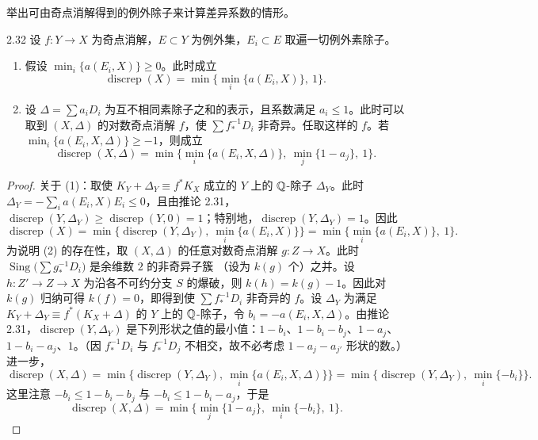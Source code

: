 
举出可由奇点消解得到的例外除子来计算差异系数的情形。

\begin{corollaryp}{2.32}
设 $f\colon Y\to X$ 为奇点消解，$E\subset Y$ 为例外集，$E_i\subset E$ 取遍一切例外素除子。
\begin{enumerate}[label=（\arabic*）,leftmargin=2.6em,itemsep=1pt]
\item 假设 $\min_i\{a(E_i,X)\}\ge0$。此时成立
\[
\operatorname{discrep}(X)=\min\bigl\{\min_i\{a(E_i,X)\},\ 1\bigr\}.
\]
\item 设 $\Delta=\sum a_iD_i$ 为互不相同素除子之和的表示，且系数满足 $a_i\le1$。此时可以取到 $(X,\Delta)$ 的对数奇点消解 $f$，使 $\sum f_*^{-1}D_i$ 非奇异。任取这样的 $f$。若 $\min_i\{a(E_i,X,\Delta)\}\ge-1$，则成立
\[
\operatorname{discrep}(X,\Delta)=\min\bigl\{\min_i\{a(E_i,X,\Delta)\},\ \min_j\{1-a_j\},\ 1\bigr\}.
\]
\end{enumerate}
\end{corollaryp}
\begin{proof}
关于 (1)：取使 $K_Y+\Delta_Y\equiv f^*K_X$ 成立的 $Y$ 上的 $\mathbb{Q}$-除子 $\Delta_Y$。此时 $\Delta_Y=-\sum_i a(E_i,X)E_i\le0$，且由推论 2.31，$\operatorname{discrep}(Y,\Delta_Y)\ge\operatorname{discrep}(Y,0)=1$；特别地，$\operatorname{discrep}(Y,\Delta_Y)=1$。因此
\[
\operatorname{discrep}(X)=\min\bigl\{\operatorname{discrep}(Y,\Delta_Y),\ \min_i\{a(E_i,X)\}\bigr\}=\min\bigl\{\min_i\{a(E_i,X)\},\ 1\bigr\}.
\]
为说明 (2) 的存在性，取 $(X,\Delta)$ 的任意对数奇点消解 $g\colon Z\to X$。此时 $\operatorname{Sing}\bigl(\sum g_*^{-1}D_i\bigr)$ 是余维数 $2$ 的非奇异子簇
（设为 $k(g)$ 个）之并。设 $h\colon Z'\to Z\to X$ 为沿各不可约分支 $S$ 的爆破，则 $k(h)=k(g)-1$。因此对 $k(g)$ 归纳可得 $k(f)=0$，即得到使 $\sum f_*^{-1}D_i$ 非奇异的 $f$。设 $\Delta_Y$ 为满足 $K_Y+\Delta_Y\equiv f^*(K_X+\Delta)$ 的 $Y$ 上的 $\mathbb{Q}$-除子，令 $b_i=-a(E_i,X,\Delta)$。由推论 2.31，$\operatorname{discrep}(Y,\Delta_Y)$ 是下列形状之值的最小值：$1-b_i$、$1-b_i-b_j$、$1-a_j$、$1-b_i-a_j$、$1$。（因 $f_*^{-1}D_i$ 与 $f_*^{-1}D_j$ 不相交，故不必考虑 $1-a_j-a_{j'}$ 形状的数。）进一步，
\[
\operatorname{discrep}(X,\Delta)=\min\bigl\{\operatorname{discrep}(Y,\Delta_Y),\ \min_i\{a(E_i,X,\Delta)\}\bigr\}=\min\bigl\{\operatorname{discrep}(Y,\Delta_Y),\ \min_i\{-b_i\}\bigr\}.
\]
这里注意 $-b_i\le1-b_i-b_j$ 与 $-b_i\le1-b_i-a_j$，于是
\[
\operatorname{discrep}(X,\Delta)=\min\bigl\{\min_j\{1-a_j\},\ \min_i\{-b_i\},\ 1\bigr\}.
\]
\end{proof}

